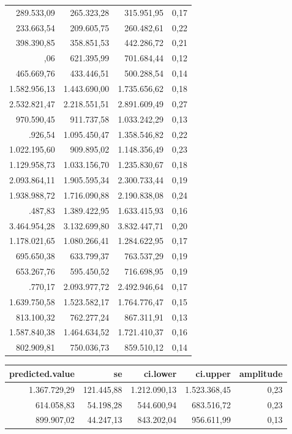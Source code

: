 \documentclass[a4paper]{article}
\begin{document}
\begin{table}
\begin{tabular}[t]{rrrr}
289.533,09 & 265.323,28 & 315.951,95 & 0,17\\
233.663,54 & 209.605,75 & 260.482,61 & 0,22\\
398.390,85 & 358.851,53 & 442.286,72 & 0,21\\
\addlinespace
660.321,06 & 621.395,99 & 701.684,44 & 0,12\\
465.669,76 & 433.446,51 & 500.288,54 & 0,14\\
1.582.956,13 & 1.443.690,00 & 1.735.656,62 & 0,18\\
2.532.821,47 & 2.218.551,51 & 2.891.609,49 & 0,27\\
970.590,45 & 911.737,58 & 1.033.242,29 & 0,13\\
\addlinespace
1.219.926,54 & 1.095.450,47 & 1.358.546,82 & 0,22\\
1.022.195,60 & 909.895,02 & 1.148.356,49 & 0,23\\
1.129.958,73 & 1.033.156,70 & 1.235.830,67 & 0,18\\
2.093.864,11 & 1.905.595,34 & 2.300.733,44 & 0,19\\
1.938.988,72 & 1.716.090,88 & 2.190.838,08 & 0,24\\
\addlinespace
1.506.487,83 & 1.389.422,95 & 1.633.415,93 & 0,16\\
3.464.954,28 & 3.132.699,80 & 3.832.447,71 & 0,20\\
1.178.021,65 & 1.080.266,41 & 1.284.622,95 & 0,17\\
695.650,38 & 633.799,37 & 763.537,29 & 0,19\\
653.267,76 & 595.450,52 & 716.698,95 & 0,19\\
\addlinespace
2.284.770,17 & 2.093.977,72 & 2.492.946,64 & 0,17\\
1.639.750,58 & 1.523.582,17 & 1.764.776,47 & 0,15\\
813.100,32 & 762.277,24 & 867.311,91 & 0,13\\
1.587.840,38 & 1.464.634,52 & 1.721.410,37 & 0,16\\
802.909,81 & 750.036,73 & 859.510,12 & 0,14\\
\bottomrule
\end{tabular}
\centering
\begin{tabular}[t]{rrrrr}
\toprule
predicted.value & se & ci.lower & ci.upper & amplitude\\
\midrule
1.367.729,29 & 121.445,88 & 1.212.090,13 & 1.523.368,45 & 0,23\\
614.058,83 & 54.198,28 & 544.600,94 & 683.516,72 & 0,23\\
899.907,02 & 44.247,13 & 843.202,04 & 956.611,99 & 0,13\\

\end{tabular}
\end{table}
\end{document}
